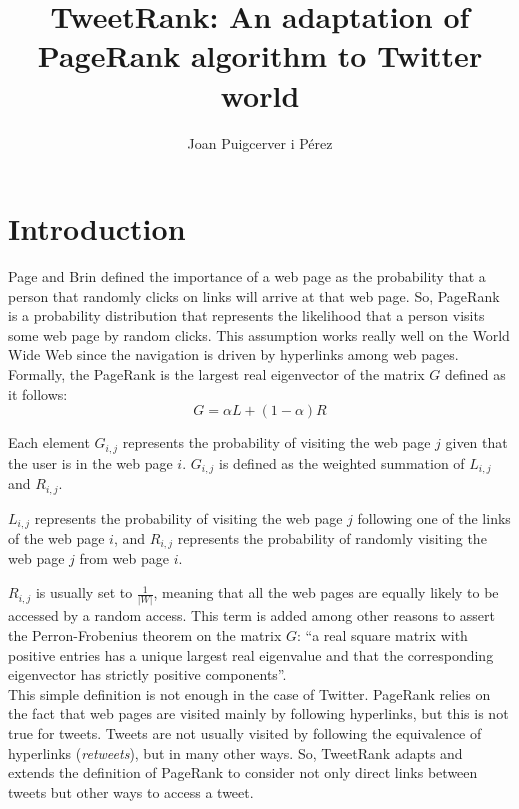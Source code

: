 \documentclass[12pt,a4paper]{article}
\author{Joan Puigcerver i Pérez}
\title{TweetRank: An adaptation of PageRank algorithm to Twitter world}
\begin{document}
\maketitle
{}

\section{Introduction}
Page and Brin defined the importance of a web page as the probability that a person that randomly clicks on links will arrive at that web page. So, PageRank is a probability distribution that represents the likelihood that a person visits some web page by random clicks. This assumption works really well on the World Wide Web since the navigation is driven by hyperlinks among web pages. \\ 

Formally, the PageRank is the largest real eigenvector of the matrix $G$ defined as it follows:
\begin{equation}\label{eq:basic_pr}
G = \alpha L + (1-\alpha) R
\end{equation}

Each element $G_{i,j}$ represents the probability of visiting the web page $j$ given that the user is in the web page $i$. $G_{i,j}$ is defined as the weighted summation of $L_{i,j}$ and $R_{i,j}$.

$L_{i,j}$ represents the probability of visiting the web page $j$ following one of the links of the web page $i$, and $R_{i,j}$ represents the probability of randomly visiting the web page $j$ from web page $i$. 

$R_{i,j}$ is usually set to $\frac{1}{|W|}$, meaning that all the web pages are equally likely to be accessed by a random access. This term is added among other reasons to assert the Perron-Frobenius theorem on the matrix $G$: ``a real square matrix with positive entries has a unique largest real eigenvalue and that the corresponding eigenvector has strictly positive components''. \\

This simple definition is not enough in the case of Twitter. PageRank relies on the fact that web pages are visited mainly by following hyperlinks, but this is not true for tweets. Tweets are not usually visited by following the equivalence of hyperlinks (\emph{retweets}), but in many other ways. So, TweetRank adapts and extends the definition of PageRank to consider not only direct links between tweets but other ways to access a tweet.
\end{document}
